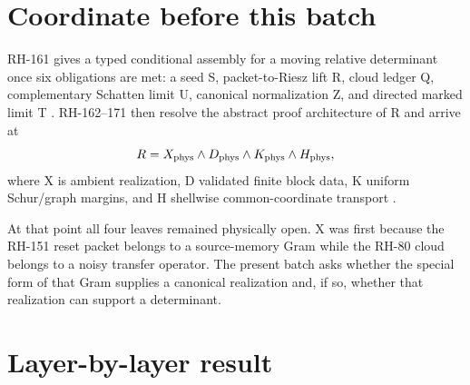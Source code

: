 \documentclass[12pt]{article}
\theoremstyle{remark}
\begin{document}
\section{Coordinate before this batch}

RH-161 gives a typed conditional assembly for a moving relative determinant
once six obligations are met: a seed S, packet-to-Riesz lift R, cloud ledger
Q, complementary Schatten limit U, canonical normalization Z, and directed
marked limit T \citep{WangRH161}.  RH-162--171 then resolve the abstract
proof architecture of R and arrive at
\begin{equation}\label{eq:old-R}
 R=X_{\rm phys}\wedge D_{\rm phys}\wedge
 K_{\rm phys}\wedge H_{\rm phys},
\end{equation}
where X is ambient realization, D validated finite block data, K uniform
Schur/graph margins, and H shellwise common-coordinate transport
\citep{WangRH171}.

At that point all four leaves remained physically open.  X was first because
the RH-151 reset packet belongs to a source-memory Gram while the RH-80 cloud
belongs to a noisy transfer operator.  The present batch asks whether the
special form of that Gram supplies a canonical realization and, if so,
whether that realization can support a determinant.

\section{Layer-by-layer result}
\end{document}
